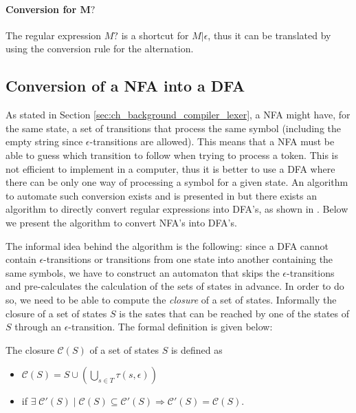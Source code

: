 \paragraph{Conversion for $\mathbf{M?}$}
The regular expression $M?$ is a shortcut for $M|\epsilon$, thus it can be translated by using the conversion rule for the alternation.

\subsection{Conversion of a NFA into a DFA}
As stated in Section \ref{sec:ch_background_compiler_lexer}, a NFA might have, for the same state, a set of transitions that process the same symbol (including the empty string since $\epsilon$-transitions are allowed). This means that a NFA must be able to guess which transition to follow when trying to process a token. This is not efficient to implement in a computer, thus it is better to use a DFA where there can be only one way of processing a symbol for a given state. An algorithm to automate such conversion exists and is presented in \cite{aho2007compilers} but there exists an algorithm to directly convert regular expressions into DFA's, as shown in \cite{aho1986compilers}. Below we present the algorithm to convert NFA's into DFA's.

The informal idea behind the algorithm is the following: since a DFA cannot contain $\epsilon$-transitions or transitions from one state into another containing the same symbols, we have to construct an automaton that skips the $\epsilon$-transitions and pre-calculates the calculation of the sets of states in advance. In order to do so, we need to be able to compute the \textit{closure} of a set of states. Informally the closure of a set of states $S$ is the sates that can be reached by one of the states of $S$ through an $\epsilon$-transition. The formal definition is given below:

\begin{definition}
	The closure $\mathcal{C}(S)$ of a set of states $S$ is defined as
	\begin{itemize}[noitemsep]
		\item 
				$\displaystyle \mathcal{C}(S) = S \cup \left(\bigcup_{s \in T} \tau(s,\epsilon)	\right)$
		\item if $\exists \; \mathcal{C}'(S) \; | \; \mathcal{C}(S) \subseteq \mathcal{C}'(S) \Rightarrow \mathcal{C}'(S) = \mathcal{C}(S)$.
	\end{itemize}	
	
\end{definition}

